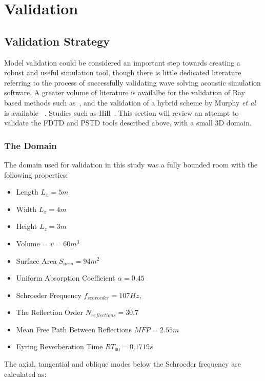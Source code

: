 
\chapter{Validation}
\section{Validation Strategy}
Model validation could be considered an important step towards creating a robust and useful simulation tool, though there is little dedicated literature referring to the process of successfully validating wave solving acoustic simulation software. A greater volume of literature is availalbe for the validation of Ray based methods such as~\cite{Ahnert2005,Tsingos2002,Foteinou2010}, and the validation of a hybrid scheme by Murphy \textit{et al} is available ~\cite{Southern2013}. Studies such as Hill~\cite{Hill2012}. This section will review an attempt to validate the FDTD and PSTD tools described above, with a small 3D domain.\\

\subsection{The Domain}
The domain used for validation in this study was a fully bounded room with the following properties:\\

\begin{itemize}
\item Length $L_x = 5m$
\item Width $L_x = 4m$
\item Height $L_z = 3m$
\item Volume = $ v = 60m^3$
\item Surface Area $S_{area} = 94m^2$
\item Uniform Absorption Coefficient $\alpha = 0.45 $
\item Schroeder Frequency  $f_{schroeder} = 107Hz $,
\item The Reflection Order $N_{reflections} = 30.7$
\item Mean Free Path Between Reflections $MFP = 2.55m$
\item Eyring Reverberation Time $RT_{60} = 0.1719s $
\end{itemize}

The axial, tangential and oblique modes below the Schroeder frequency are calculated as:\\


